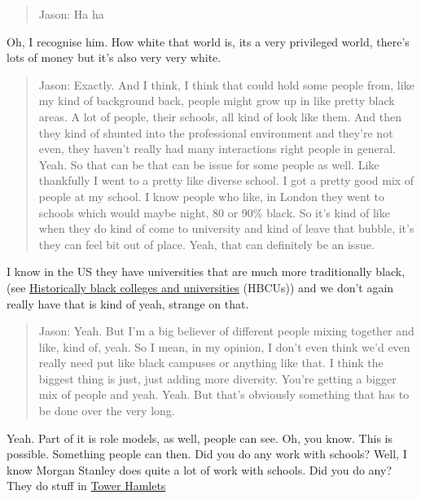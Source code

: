\documentclass[
]{book}
\begin{document}
\begin{quote}
Jason: Ha ha
\end{quote}

Oh, I recognise him. How white that world is, its a very privileged world, there's lots of money but it's also very very white.

\begin{quote}
Jason: Exactly. And I think, I think that could hold some people from, like my kind of background back, people might grow up in like pretty black areas. A lot of people, their schools, all kind of look like them. And then they kind of shunted into the professional environment and they're not even, they haven't really had many interactions right people in general. Yeah. So that can be that can be issue for some people as well. Like thankfully I went to a pretty like diverse school. I got a pretty good mix of people at my school. I know people who like, in London they went to schools which would maybe night, 80 or 90\% black. So it's kind of like when they do kind of come to university and kind of leave that bubble, it's they can feel bit out of place. Yeah, that can definitely be an issue.
\end{quote}

I know in the US they have universities that are much more traditionally black, (see \href{https://en.wikipedia.org/wiki/Historically_black_colleges_and_universities}{Historically black colleges and universities} (HBCUs)) and we don't again really have that is kind of yeah, strange on that.

\begin{quote}
Jason: Yeah. But I'm a big believer of different people mixing together and like, kind of, yeah. So I mean, in my opinion, I don't even think we'd even really need put like black campuses or anything like that. I think the biggest thing is just, just adding more diversity. You're getting a bigger mix of people and yeah. Yeah. But that's obviously something that has to be done over the very long.
\end{quote}

Yeah. Part of it is role models, as well, people can see. Oh, you know. This is possible. Something people can then. Did you do any work with schools? Well, I know Morgan Stanley does quite a lot of work with schools. Did you do any? They do stuff in \href{https://en.wikipedia.org/wiki/London_Borough_of_Tower_Hamlets}{Tower Hamlets}
\end{document}
